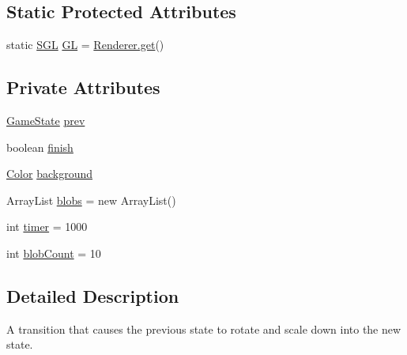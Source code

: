 \subsection*{Static Protected Attributes}
\begin{DoxyCompactItemize}
\item 
static \mbox{\hyperlink{interfaceorg_1_1newdawn_1_1slick_1_1opengl_1_1renderer_1_1_s_g_l}{S\+GL}} \mbox{\hyperlink{classorg_1_1newdawn_1_1slick_1_1state_1_1transition_1_1_blobby_transition_a321de16dae601cd2ba821b1880e83174}{GL}} = \mbox{\hyperlink{classorg_1_1newdawn_1_1slick_1_1opengl_1_1renderer_1_1_renderer_abe742c3a7dfca67c6c01821d27087308}{Renderer.\+get}}()
\end{DoxyCompactItemize}
\subsection*{Private Attributes}
\begin{DoxyCompactItemize}
\item 
\mbox{\hyperlink{interfaceorg_1_1newdawn_1_1slick_1_1state_1_1_game_state}{Game\+State}} \mbox{\hyperlink{classorg_1_1newdawn_1_1slick_1_1state_1_1transition_1_1_blobby_transition_a3bb220b6374d73d624f348b722941410}{prev}}
\item 
boolean \mbox{\hyperlink{classorg_1_1newdawn_1_1slick_1_1state_1_1transition_1_1_blobby_transition_af3dee2fc9e6c3847986c9454f5f9e662}{finish}}
\item 
\mbox{\hyperlink{classorg_1_1newdawn_1_1slick_1_1_color}{Color}} \mbox{\hyperlink{classorg_1_1newdawn_1_1slick_1_1state_1_1transition_1_1_blobby_transition_a53b1caa1a2eccd2cbb1a5d46b3f2c95b}{background}}
\item 
Array\+List \mbox{\hyperlink{classorg_1_1newdawn_1_1slick_1_1state_1_1transition_1_1_blobby_transition_a24d7e69f14903f10e5849398b9df536a}{blobs}} = new Array\+List()
\item 
int \mbox{\hyperlink{classorg_1_1newdawn_1_1slick_1_1state_1_1transition_1_1_blobby_transition_a9c62d18a6e6a73289933ff47661dc637}{timer}} = 1000
\item 
int \mbox{\hyperlink{classorg_1_1newdawn_1_1slick_1_1state_1_1transition_1_1_blobby_transition_aac660f5cbb6b51185d91010cd8566caf}{blob\+Count}} = 10
\end{DoxyCompactItemize}


\subsection{Detailed Description}
A transition that causes the previous state to rotate and scale down into the new state.


